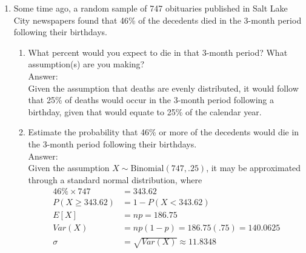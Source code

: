 \documentclass{article}
\begin{document}
\begin{enumerate}
\begin{enumerate}
                    One can estimate the $\sigma$ values by assigning $Z$ values of 1, 2, or 3, and rearranging the 
                    equation to obtain $\sigma = |\frac{X - \mu}{Z}|$, with the absolute value taken to account for 
                    negative sigmas, and where $\mu$ is the median value of the data at the
                    50\% mark and $X$ is the value obtained at the points deviating from the median by $\pm$ 34.14\%, 47.72\%,
                    and 49.87\% for $\sigma$, $2\sigma$, and $3\sigma$ respectively. Each of these obtained sigmas may then be
                    averaged, given by 
                    $\sigma_{\text{avg}} = \frac{\sigma_{+1}+\sigma_{-1}+\sigma_{+2}+\sigma_{-2}+\sigma_{+3}+\sigma_{-3}}{6}$.
        \end{enumerate}
    \clearpage
    \item   Some time ago, a random sample of 747 obituaries published in Salt Lake City newspapers found that 46\% of 
            the decedents died in the 3-month period following their birthdays.
        \begin{enumerate}
            \item   What percent would you expect to die in that 3-month period? What assumption(s) are you making?\\
                Answer:\\
                Given the assumption that deaths are evenly distributed, it would follow that 25\% of deaths would occur
                in the 3-month period following a birthday, given that would equate to 25\% of the calendar year.
            \item   Estimate the probability that 46\% or more of the decedents would die in the 3-month period following 
                    their birthdays. \\
                Answer:\\
                Given the assumption $X \sim \text{Binomial}(747,.25)$, it may be approximated through a standard normal distribution, where
                \begin{align*}
                    46\% \times 747 &= 343.62 \\
                    P(X \geq 343.62) &= 1 - P(X < 343.62) \\
                    E[X] &= np = 186.75 \\
                    Var(X) &= np(1-p) = 186.75(.75) = 140.0625\\
                    \sigma &= \sqrt{Var(X)} \approx 11.8348
                \end{align*}

\end{enumerate}
\end{enumerate}
\end{document}
